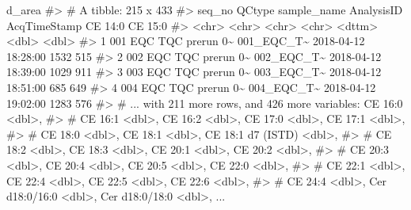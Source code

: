 \documentclass[
  letterpaper,
  DIV=11,
  numbers=noendperiod]{scrreprt}
\newenvironment{Shaded}{\begin{snugshade}}{\end{snugshade}}
\newcommand{\CommentTok}[1]{\textcolor[rgb]{0.37,0.37,0.37}{#1}}
\newcommand{\NormalTok}[1]{\textcolor[rgb]{0.00,0.23,0.31}{#1}}
\begin{document}
\begin{Shaded}
\begin{Highlighting}[]
\NormalTok{d\_area}
\CommentTok{\#\textgreater{} \# A tibble: 215 x 433}
\CommentTok{\#\textgreater{}   seq\_no QCtype sample\_name   AnalysisID AcqTimeStamp        \textasciigrave{}CE 14:0\textasciigrave{} \textasciigrave{}CE 15:0\textasciigrave{}}
\CommentTok{\#\textgreater{}   \textless{}chr\textgreater{}  \textless{}chr\textgreater{}  \textless{}chr\textgreater{}         \textless{}chr\textgreater{}      \textless{}dttm\textgreater{}                  \textless{}dbl\textgreater{}     \textless{}dbl\textgreater{}}
\CommentTok{\#\textgreater{} 1 001    EQC    TQC prerun 0\textasciitilde{} 001\_EQC\_T\textasciitilde{} 2018{-}04{-}12 18:28:00      1532       515}
\CommentTok{\#\textgreater{} 2 002    EQC    TQC prerun 0\textasciitilde{} 002\_EQC\_T\textasciitilde{} 2018{-}04{-}12 18:39:00      1029       911}
\CommentTok{\#\textgreater{} 3 003    EQC    TQC prerun 0\textasciitilde{} 003\_EQC\_T\textasciitilde{} 2018{-}04{-}12 18:51:00       685       649}
\CommentTok{\#\textgreater{} 4 004    EQC    TQC prerun 0\textasciitilde{} 004\_EQC\_T\textasciitilde{} 2018{-}04{-}12 19:02:00      1283       576}
\CommentTok{\#\textgreater{} \# ... with 211 more rows, and 426 more variables: \textasciigrave{}CE 16:0\textasciigrave{} \textless{}dbl\textgreater{},}
\CommentTok{\#\textgreater{} \#   \textasciigrave{}CE 16:1\textasciigrave{} \textless{}dbl\textgreater{}, \textasciigrave{}CE 16:2\textasciigrave{} \textless{}dbl\textgreater{}, \textasciigrave{}CE 17:0\textasciigrave{} \textless{}dbl\textgreater{}, \textasciigrave{}CE 17:1\textasciigrave{} \textless{}dbl\textgreater{},}
\CommentTok{\#\textgreater{} \#   \textasciigrave{}CE 18:0\textasciigrave{} \textless{}dbl\textgreater{}, \textasciigrave{}CE 18:1\textasciigrave{} \textless{}dbl\textgreater{}, \textasciigrave{}CE 18:1 d7 (ISTD)\textasciigrave{} \textless{}dbl\textgreater{},}
\CommentTok{\#\textgreater{} \#   \textasciigrave{}CE 18:2\textasciigrave{} \textless{}dbl\textgreater{}, \textasciigrave{}CE 18:3\textasciigrave{} \textless{}dbl\textgreater{}, \textasciigrave{}CE 20:1\textasciigrave{} \textless{}dbl\textgreater{}, \textasciigrave{}CE 20:2\textasciigrave{} \textless{}dbl\textgreater{},}
\CommentTok{\#\textgreater{} \#   \textasciigrave{}CE 20:3\textasciigrave{} \textless{}dbl\textgreater{}, \textasciigrave{}CE 20:4\textasciigrave{} \textless{}dbl\textgreater{}, \textasciigrave{}CE 20:5\textasciigrave{} \textless{}dbl\textgreater{}, \textasciigrave{}CE 22:0\textasciigrave{} \textless{}dbl\textgreater{},}
\CommentTok{\#\textgreater{} \#   \textasciigrave{}CE 22:1\textasciigrave{} \textless{}dbl\textgreater{}, \textasciigrave{}CE 22:4\textasciigrave{} \textless{}dbl\textgreater{}, \textasciigrave{}CE 22:5\textasciigrave{} \textless{}dbl\textgreater{}, \textasciigrave{}CE 22:6\textasciigrave{} \textless{}dbl\textgreater{},}
\CommentTok{\#\textgreater{} \#   \textasciigrave{}CE 24:4\textasciigrave{} \textless{}dbl\textgreater{}, \textasciigrave{}Cer d18:0/16:0\textasciigrave{} \textless{}dbl\textgreater{}, \textasciigrave{}Cer d18:0/18:0\textasciigrave{} \textless{}dbl\textgreater{}, ...}
\end{Highlighting}
\end{Shaded}
\end{document}
